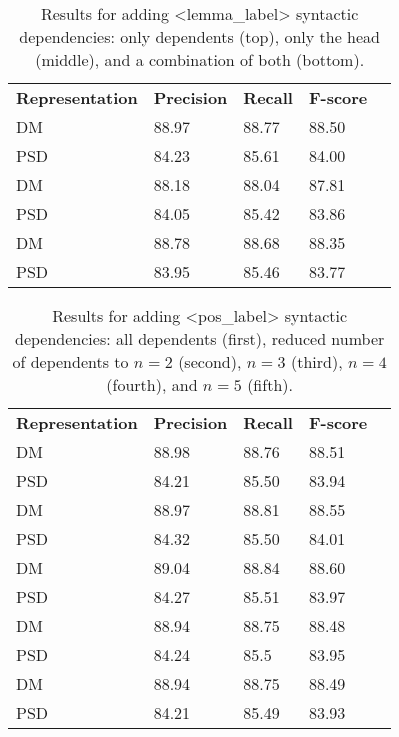 \begin{table}
    \centering
    \smaller[0.2]
    \begin{tabular}{@{}lllll@{}}
        \toprule
        \textbf{Representation} & \textbf{Precision} & \textbf{Recall} & \textbf{F-score} \\
        DM &  88.97 & 88.77 & 88.50 \\
        PSD & 84.23 & 85.61 & 84.00 \\
        \midrule
        DM &  88.18 & 88.04 & 87.81 \\
        PSD & 84.05 & 85.42 & 83.86 \\
        \midrule
        DM &  88.78 & 88.68 & 88.35 \\
        PSD & 83.95 & 85.46 & 83.77 \\
        \bottomrule
    \end{tabular}
    \caption{Results for adding <lemma\_label> syntactic dependencies: only dependents (top), only the head (middle), and a combination of both (bottom).}
    \label{table:dependents_head}
\end{table}

\begin{table}
    \centering
    \smaller[0.2]
    \begin{tabular}{@{}lllll@{}}
        \toprule
        \textbf{Representation} & \textbf{Precision} & \textbf{Recall} & \textbf{F-score} \\
        DM &  88.98 & 88.76 & 88.51 \\
        PSD & 84.21 & 85.50 & 83.94 \\
        \midrule
        DM &  88.97 & 88.81 & 88.55 \\
        PSD & 84.32 & 85.50 & 84.01 \\
        \midrule
        DM &  89.04 & 88.84 & 88.60 \\
        PSD & 84.27 & 85.51 & 83.97 \\
        \midrule
        DM &  88.94 & 88.75 & 88.48 \\
        PSD & 84.24 & 85.5 & 83.95 \\
        \midrule
        DM &  88.94 & 88.75 & 88.49 \\
        PSD & 84.21 & 85.49 & 83.93 \\
        \bottomrule
    \end{tabular}
    \caption{Results for adding <pos\_label> syntactic dependencies: all dependents (first), reduced number of dependents to $n=2$ (second), $n=3$ (third), $n=4$ (fourth), and $n=5$ (fifth).}
    \label{table:syntactic_dependents_n}
\end{table}

